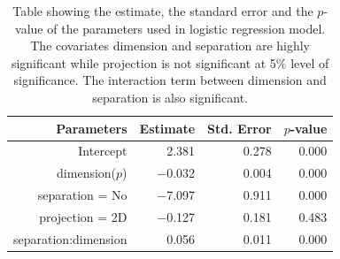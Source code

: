 \begin{table}[ht]
\begin{center}
\caption{Table showing the estimate, the standard error and the $p$-value of the parameters used in logistic regression model. The covariates dimension and separation are highly significant while projection is not significant at 5\% level of significance. The interaction term between dimension and separation is also significant.}
\vspace{0.15cm}
\begin{tabular}{r|rrr}
\hline
  \hline
 Parameters & Estimate & Std. Error  & $p$-value \\ 
  \hline
Intercept  & 2.381 & 0.278  & 0.000 \\ 
  dimension($p$) & $-$0.032 & 0.004  & 0.000 \\ 
  separation = No & $-$7.097 & 0.911  & 0.000 \\ 
  projection = 2D & $-$0.127 & 0.181  & 0.483 \\ 
  separation:dimension & 0.056 & 0.011 & 0.000\\
   \hline
\end{tabular}
\label{params}
\end{center}
\end{table}


%
 



